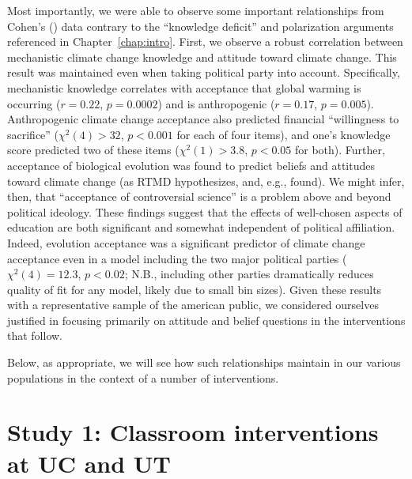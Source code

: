 Most importantly, we were able to observe some important relationships from
Cohen’s (\citeyear{cohen_san_2012_f}) data contrary to the “knowledge deficit”
and polarization arguments referenced in Chapter~\ref{chap:intro}. 
First, we observe a robust correlation between mechanistic climate change
knowledge and attitude toward climate change.  This result was maintained even
when taking political party into account.  Specifically, mechanistic knowledge
correlates with acceptance that global warming is occurring ($r=0.22$,
$p=0.0002$) and is anthropogenic ($r=0.17$, $p=0.005$).  Anthropogenic climate
change acceptance also predicted financial “willingness to sacrifice” ($χ^2(4) >
32$, $p<0.001$ for each of four items), and one’s knowledge score predicted two
of these items ($χ^2(1) > 3.8$, $p<0.05$ for both). Further, acceptance of
biological evolution was found to predict beliefs and attitudes toward climate
change (as RTMD hypothesizes, and, e.g., \cite{ranney_why_2012} found). We might
infer, then, that “acceptance of controversial science” is a problem above and
beyond political ideology. These findings suggest that the effects of
well-chosen aspects of education are both significant and somewhat independent
of political affiliation. Indeed, evolution acceptance was a significant
predictor of climate change acceptance even in a model including the two major
political parties ($\chi^2(4)=12.3$, $p<0.02$; N.B., including other parties
dramatically reduces quality of fit for any model, likely due to small bin
sizes). Given these results with a representative sample of the american public,
we considered ourselves justified in focusing primarily on attitude and belief
questions in the interventions that follow.

Below, as appropriate, we will see how such relationships maintain
in our various populations in the context of a number of interventions.

% 

\section{Study 1: Classroom interventions at UC and UT}
\label{sec:mech-classroom}

